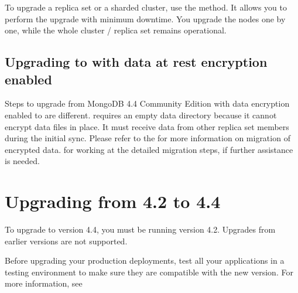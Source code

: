 \documentclass[letterpaper,10pt,english]{sphinxmanual}
\begin{document}
\sphinxAtStartPar
To upgrade a replica set or a sharded cluster, use the {\hyperref[\detokenize{glossary:term-Rolling-restart}]{}} method. It allows you to perform the upgrade with minimum downtime. You upgrade the nodes one by one, while the whole cluster / replica set remains operational.


\section{Upgrading to  with data at rest encryption enabled}
\label{\detokenize{install/upgrade-from-mongodb:upgrading-to-psmdb-with-data-at-rest-encryption-enabled}}\label{\detokenize{install/upgrade-from-mongodb:upgrade-encryption}}
\sphinxAtStartPar
Steps to upgrade from MongoDB 4.4 Community Edition with data encryption enabled to  are different.  requires an empty  data directory because it cannot encrypt data files in place. It must receive data from other replica set members during the initial sync. Please refer to the {\hyperref[\detokenize{inmemory:switch-storage-engines}]{}} for more information on migration of encrypted data.  for working at the detailed migration steps, if further assistance is needed.


\chapter{Upgrading from  4.2 to 4.4}
\label{\detokenize{install/upgrade-from-42:upgrading-from-psmdb-prev-version-to-version}}\label{\detokenize{install/upgrade-from-42:upgrade-from-42}}\label{\detokenize{install/upgrade-from-42::doc}}
\sphinxAtStartPar
To upgrade  to version 4.4, you must be running version
4.2. Upgrades from earlier versions are not supported.

\sphinxAtStartPar
Before upgrading your production  deployments, test all your applications
in a testing environment to make sure they are compatible with the new version.
For more information, see 
\end{document}
